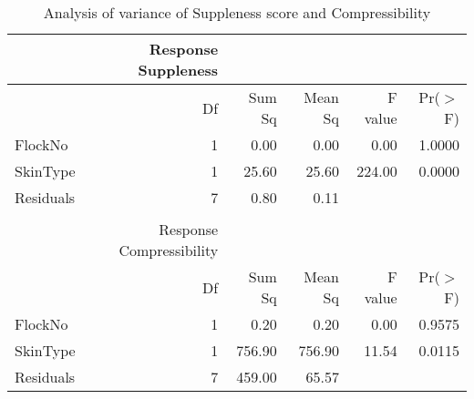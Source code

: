\begin{table}[ht]
\centering
\caption{Analysis of variance of Suppleness score and Compressibility}
\label{tab:macrot1aov}
\vspace{0.1in}

\begin{tabular}{lrrrrr}
 & Response Suppleness & & & \\
  \hline
 & Df & Sum Sq & Mean Sq & F value & Pr($>$F) \\ 
  \hline
FlockNo     & 1 & 0.00 & 0.00 & 0.00 & 1.0000 \\ 
  SkinType    & 1 & 25.60 & 25.60 & 224.00 & 0.0000 \\ 
  Residuals   & 7 & 0.80 & 0.11 &  &  \\ 
   \hline
\\
 & Response Compressibility & & & \\
  \hline
 & Df & Sum Sq & Mean Sq & F value & Pr($>$F) \\ 
  \hline
FlockNo & 1 & 0.20 & 0.20 & 0.00 & 0.9575 \\ 
  SkinType & 1 & 756.90 & 756.90 & 11.54 & 0.0115 \\ 
  Residuals & 7 & 459.00 & 65.57 &  &  \\ 
   \hline
\end{tabular}
\end{table}


